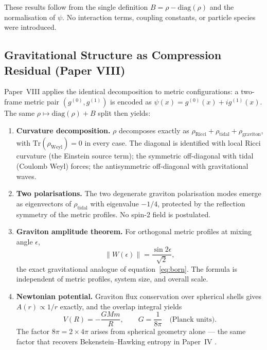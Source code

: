 \documentclass[11pt]{article}
\begin{document}
These results follow from the single definition
$B = \rho - \mathrm{diag}(\rho)$ and the normalisation of $\psi$.
No interaction terms, coupling constants, or particle species were
introduced.

\subsection{Gravitational Structure as Compression Residual (Paper VIII)}

Paper~VIII \cite{meskanen2026viii} applies the identical decomposition
to metric configurations: a two-frame metric pair
$(g^{(0)}, g^{(1)})$ is encoded as $\psi(x) = g^{(0)}(x) + ig^{(1)}(x)$.
The same $\rho \mapsto \mathrm{diag}(\rho) + B$ split then yields:

\begin{enumerate}
  \item \textbf{Curvature decomposition.}
        $\rho$ decomposes exactly as
        $\rho_{\mathrm{Ricci}} + \rho_{\mathrm{tidal}} +
        \rho_{\mathrm{graviton}}$,
        with $\mathrm{Tr}(\rho_{\mathrm{Weyl}}) = 0$ in every case.
        The diagonal is identified with local Ricci curvature (the
        Einstein source term); the symmetric off-diagonal with tidal
        (Coulomb Weyl) forces; the antisymmetric off-diagonal with
        gravitational waves.

  \item \textbf{Two polarisations.}
        The two degenerate graviton polarisation modes emerge as
        eigenvectors of $\rho_{\mathrm{tidal}}$ with eigenvalue
        $-1/4$, protected by the reflection symmetry of the metric
        profiles.
        No spin-2 field is postulated.

  \item \textbf{Graviton amplitude theorem.}
        For orthogonal metric profiles at mixing angle $\epsilon$,
        \begin{equation}
          \|W(\epsilon)\| = \frac{\sin 2\epsilon}{\sqrt{2}},
          \label{eq:graviton}
        \end{equation}
        the exact gravitational analogue of equation~\eqref{eq:born}.
        The formula is independent of metric profiles, system size,
        and overall scale.

  \item \textbf{Newtonian potential.}
        Graviton flux conservation over spherical shells gives
        $A(r) \propto 1/r$ exactly, and the overlap integral yields
        \begin{equation}
          V(R) = -\frac{GMm}{R},
          \qquad G = \frac{1}{8\pi} \quad \text{(Planck units)}.
          \label{eq:newton}
        \end{equation}
        The factor $8\pi = 2 \times 4\pi$ arises from spherical
        geometry alone --- the same factor that recovers
        Bekenstein--Hawking entropy in Paper~IV
        \cite{meskanen2026iv}.


\end{enumerate}
\end{document}
